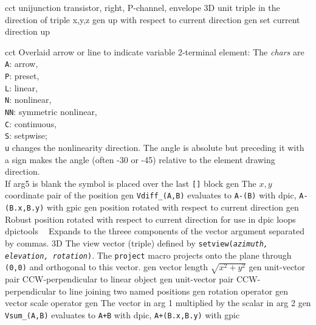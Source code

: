 %
  {cct}%
  {unijunction transistor, right, P-channel, envelope
    }%
%
  {3D} {unit triple in the direction of triple x,y,z}%
%
  {gen}%
  {up with respect to current direction}%
%
  {gen}%
  {set current direction up }%

%

%
  {cct}%
  {Overlaid arrow or line to indicate variable 2-terminal element:
    The {\sl chars} are\\
    {\tt A}: arrow,\\
    {\tt P}: preset,\\
    {\tt L}: linear,\\
    {\tt N}:  nonlinear,\\
    {\tt NN}:  symmetric nonlinear,\\
    {\tt C}: continuous,\\
    {\tt S}: setpwise;\\
    {\tt u} changes the nonlinearity direction.  The angle is absolute
    but preceding it with a sign makes the angle (often -30 or -45)
    relative to the element drawing direction.\\
    If arg5 is blank the symbol is placed over the last {\tt []} block
   }%
%
  {gen}%
  {The $x, y$ coordinate pair of the position}%
%
  {gen}%
  {{\tt Vdiff\_(A,B)} evaluates to {\tt A-(B)} with dpic, {\tt A-(B.x,B.y)}
   with gpic}%
%
  {gen}%
  {position rotated with respect to current direction}%
%
  {gen}%
  {Robust position rotated with respect to current direction for use in
   dpic loops}%
%
  {dpictools}%
  {$\;\;$ Expands to the threee components of the vector argument separated
    by commas.}%
%
  {3D} {The view vector (triple) defined by {\tt setview({\sl azimuth,
   elevation, rotation})}. The {\tt project} macro projects onto the plane
   through {\tt (0,0)} and orthogonal to this vector.}%
%
  {gen}%
  {vector length $\sqrt{x^2+y^2}$}%
%
  {gen}%
  {unit-vector pair CCW-perpendicular to linear object}%
%
  {gen}%
  {unit-vector pair CCW-perpendicular to line joining two named positions}%
%
  {gen}%
  {rotation operator}%
%
  {gen}%
  {vector scale operator}%
%
  {gen}%
  {The vector in arg 1 multiplied by the scalar in arg 2}%
%
  {gen}%
  {{\tt Vsum\_(A,B)} evaluates to {\tt A+B} with dpic, {\tt A+(B.x,B.y)}
   with gpic}%

